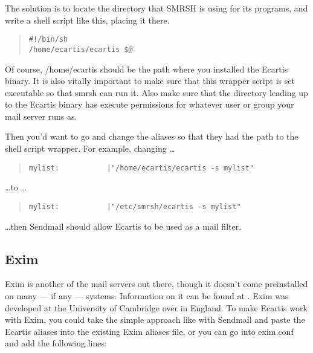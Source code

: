 \documentclass{book}
\begin{document}
The solution is to locate the directory that SMRSH is using for its programs,
and write a shell script like this, placing it there.
   
\begin{quote}
\footnotesize
\begin{verbatim}
#!/bin/sh
/home/ecartis/ecartis $@
\end{verbatim}
\end{quote}

Of course, /home/ecartis should be the path where you installed the Ecartis
binary.  It is also vitally important to make sure that this wrapper script is
set executable so that smrsh can run it.  Also make sure that the directory
leading up to the Ecartis binary has execute permissions for whatever user or
group your mail server runs as.
   
Then you'd want to go and change the aliases so that they had the path to the
shell script wrapper.  For example, changing \ldots
   
\begin{quote}   
\footnotesize
\begin{verbatim}
mylist:           |"/home/ecartis/ecartis -s mylist"
\end{verbatim}
\end{quote} 
   
\ldots to \ldots
   
\begin{quote}
\footnotesize
\begin{verbatim}
mylist:           |"/etc/smrsh/ecartis -s mylist"
\end{verbatim}
\end{quote}
   
\ldots then Sendmail should allow Ecartis to be used as a mail filter.
   
\subsection{Exim}
\label{starting:filters:exim}

Exim is another of the mail servers out there, though it doesn't come
preinstalled on many --- if any --- systems.  Information on it can be found
at .  Exim was developed at the University of
Cambridge over in England.  To make Ecartis work with Exim, you could take the
simple approach like with Sendmail and paste the Ecartis aliases into the
existing Exim aliases file, or you can go into exim.conf and add the following
lines:
   
\end{document}
